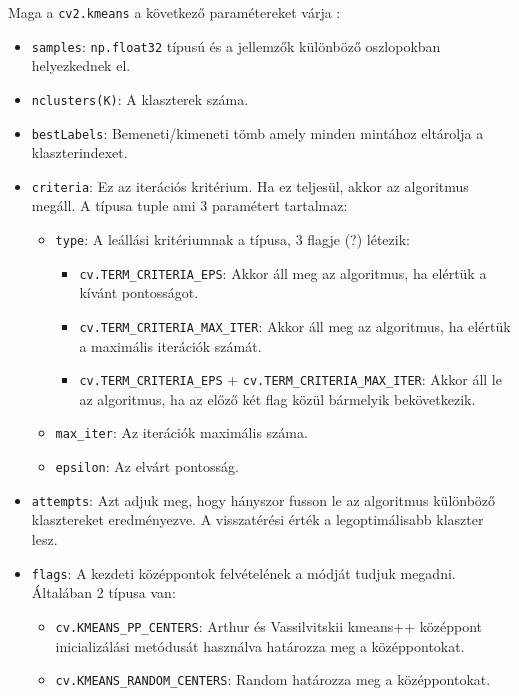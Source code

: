 Maga a \texttt{cv2.kmeans} a következő paramétereket várja \cite{kmeans_opencv}:
\begin{itemize}
\item \texttt{samples}: \texttt{np.float32} típusú és a jellemzők különböző oszlopokban helyezkednek el.
\item \texttt{nclusters(K)}: A klaszterek száma.
\item \texttt{bestLabels}: Bemeneti/kimeneti tömb amely minden mintához eltárolja a klaszterindexet.
\item \texttt{criteria}: Ez az iterációs kritérium. Ha ez teljesül, akkor az algoritmus megáll. A típusa tuple ami 3 paramétert tartalmaz:
    \begin{itemize}
    \item \texttt{type}: A leállási kritériumnak a típusa, 3 flagje (?) létezik:
        \begin{itemize}
        \item \texttt{cv.TERM\_CRITERIA\_EPS}: Akkor áll meg az algoritmus, ha elértük a kívánt pontosságot.
        \item \texttt{cv.TERM\_CRITERIA\_MAX\_ITER}: Akkor áll meg az algoritmus, ha elértük a maximális iterációk számát.
        \item \texttt{cv.TERM\_CRITERIA\_EPS} + \texttt{cv.TERM\_CRITERIA\_MAX\_ITER}: Akkor áll le az algoritmus, ha az előző két flag közül bármelyik bekövetkezik.
        \end{itemize}
    \item \texttt{max\_iter}: Az iterációk maximális száma.
    \item \texttt{epsilon}: Az elvárt pontosság.
    \end{itemize}
\item \texttt{attempts}: Azt adjuk meg, hogy hányszor fusson le az algoritmus különböző klasztereket eredményezve. A visszatérési érték a legoptimálisabb klaszter lesz.
\item \texttt{flags}: A kezdeti középpontok felvételének a módját tudjuk megadni. Általában 2 típusa van:
    \begin{itemize}
    \item \texttt{cv.KMEANS\_PP\_CENTERS}: Arthur és Vassilvitskii kmeans++ középpont inicializálási metódusát használva határozza meg a középpontokat.
    \item \texttt{cv.KMEANS\_RANDOM\_CENTERS}: Random határozza meg a középpontokat.
    \end{itemize}
\end{itemize}

